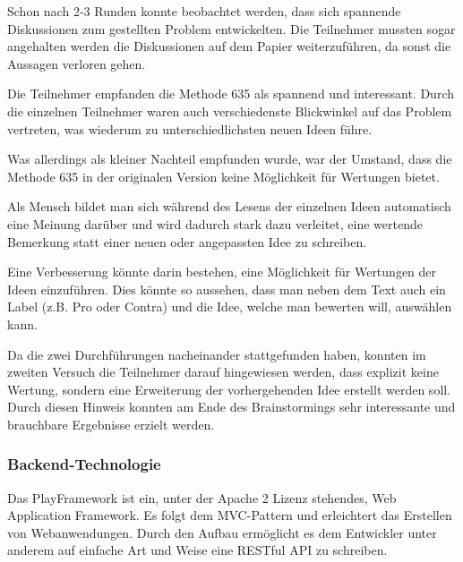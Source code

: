 \begin{description}[leftmargin=!,labelwidth=\widthof{\bfseries Zielstrebige Lösungsfindung }]
	\item[Diskussion gestartet] Schon nach 2-3 Runden konnte beobachtet werden, dass sich spannende Diskussionen zum gestellten Problem entwickelten. Die Teilnehmer mussten sogar angehalten werden die Diskussionen auf dem Papier weiterzuführen, da sonst die Aussagen verloren gehen.
	
	\item[Interessante Methode] Die Teilnehmer empfanden die Methode 635 als spannend und interessant. Durch die einzelnen Teilnehmer waren auch verschiedenste Blickwinkel auf das Problem vertreten, was wiederum zu unterschiedlichsten neuen Ideen führe.
	
	\item[Wertung einführen] Was allerdings als kleiner Nachteil empfunden wurde, war der Umstand, dass die Methode 635 in der originalen Version keine Möglichkeit für Wertungen bietet. 
	
	Als Mensch bildet man sich während des Lesens der einzelnen Ideen automatisch eine Meinung darüber und wird dadurch stark dazu verleitet, eine wertende Bemerkung statt einer neuen oder angepassten Idee zu schreiben.
	
	Eine Verbesserung könnte darin bestehen, eine Möglichkeit für Wertungen der Ideen einzuführen. Dies könnte so aussehen, dass man neben dem Text auch ein Label (z.B. Pro oder Contra) und die Idee, welche man bewerten will, auswählen kann.
	
	\item[Zielstrebige Lösungsfindung] Da die zwei Durchführungen nacheinander stattgefunden haben, konnten im zweiten Versuch die Teilnehmer darauf hingewiesen werden, dass explizit keine Wertung, sondern eine Erweiterung der vorhergehenden Idee erstellt werden soll. Durch diesen Hinweis konnten am Ende des Brainstormings sehr interessante und brauchbare Ergebnisse erzielt werden.
\end{description}

\subsubsection{Backend-Technologie}
Das PlayFramework \cite{PlayFramework} ist ein, unter der Apache 2 Lizenz stehendes, Web Application Framework. Es folgt dem MVC-Pattern und erleichtert das Erstellen von Webanwendungen. Durch den Aufbau ermöglicht es dem Entwickler unter anderem auf einfache Art und Weise eine RESTful API zu schreiben. 

